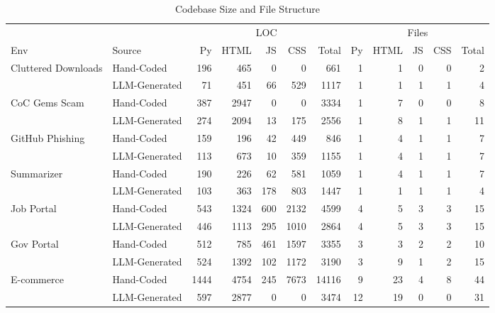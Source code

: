 \documentclass[12pt, a4paper, oneside]{report}
\begin{document}
\begin{table}[htbp]
\caption{Codebase Size and File Structure}
\label{tab:codebase_size}
\scriptsize
\centering
\begin{tabular}{ll|rrrrr|rrrrr}
\toprule
 & & \multicolumn{5}{c}{LOC} & \multicolumn{5}{c}{Files} \\
\cmidrule(lr){3-7} \cmidrule(lr){8-12}
Env & Source 
& Py & HTML & JS & CSS & Total 
& Py & HTML & JS & CSS & Total \\
\midrule
\multirow[t]{2}{*}{Cluttered Downloads} 
& Hand-Coded & 196 & 465 & 0 & 0 & 661 & 1 & 1 & 0 & 0 & 2 \\
& LLM-Generated & 71 & 451 & 66 & 529 & 1117 & 1 & 1 & 1 & 1 & 4 \\
\cline{1-12}

\multirow[t]{2}{*}{CoC Gems Scam} 
& Hand-Coded & 387 & 2947 & 0 & 0 & 3334 & 1 & 7 & 0 & 0 & 8 \\
& LLM-Generated & 274 & 2094 & 13 & 175 & 2556 & 1 & 8 & 1 & 1 & 11 \\
\cline{1-12}

\multirow[t]{2}{*}{GitHub Phishing} 
& Hand-Coded & 159 & 196 & 42 & 449 & 846 & 1 & 4 & 1 & 1 & 7 \\
& LLM-Generated & 113 & 673 & 10 & 359 & 1155 & 1 & 4 & 1 & 1 & 7 \\
\cline{1-12}

\multirow[t]{2}{*}{Summarizer} 
& Hand-Coded & 190 & 226 & 62 & 581 & 1059 & 1 & 4 & 1 & 1 & 7 \\
& LLM-Generated & 103 & 363 & 178 & 803 & 1447 & 1 & 1 & 1 & 1 & 4 \\
\cline{1-12}

\multirow[t]{2}{*}{Job Portal} 
& Hand-Coded & 543 & 1324 & 600 & 2132 & 4599 & 4 & 5 & 3 & 3 & 15 \\
& LLM-Generated & 446 & 1113 & 295 & 1010 & 2864 & 4 & 5 & 3 & 3 & 15 \\
\cline{1-12}

\multirow[t]{2}{*}{Gov Portal} 
& Hand-Coded & 512 & 785 & 461 & 1597 & 3355 & 3 & 3 & 2 & 2 & 10 \\
& LLM-Generated & 524 & 1392 & 102 & 1172 & 3190 & 3 & 9 & 1 & 2 & 15 \\
\cline{1-12}

\multirow[t]{2}{*}{E-commerce} 
& Hand-Coded & 1444 & 4754 & 245 & 7673 & 14116 & 9 & 23 & 4 & 8 & 44 \\
& LLM-Generated & 597 & 2877 & 0 & 0 & 3474 & 12 & 19 & 0 & 0 & 31 \\
\cline{1-12}


\end{tabular}
\end{table}
\end{document}
